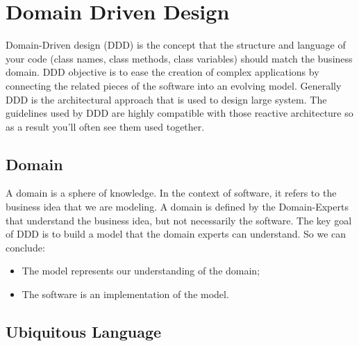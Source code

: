 \chapter{Domain Driven Design}

Domain-Driven design (DDD) is the concept that the structure and language of your code (class names, class methods, class variables) should match the business domain. DDD objective is to ease the creation of complex applications by connecting the related pieces of the software into an evolving model. Generally DDD is the architectural approach that is used to design large system. The guidelines used by DDD are highly compatible with those reactive architecture so as a result you'll often see them used together.

\section{Domain}

A domain is a sphere of knowledge. In the context of software, it refers to the business idea that we are modeling. A domain is defined by the Domain-Experts that understand the business idea, but not necessarily the software. The key goal of DDD is to build a model that the domain experts can understand. So we can conclude:
\begin{itemize}
    \item The model represents our understanding of the domain;
    \item The software is an implementation of the model.
\end{itemize}

\section{Ubiquitous Language}

